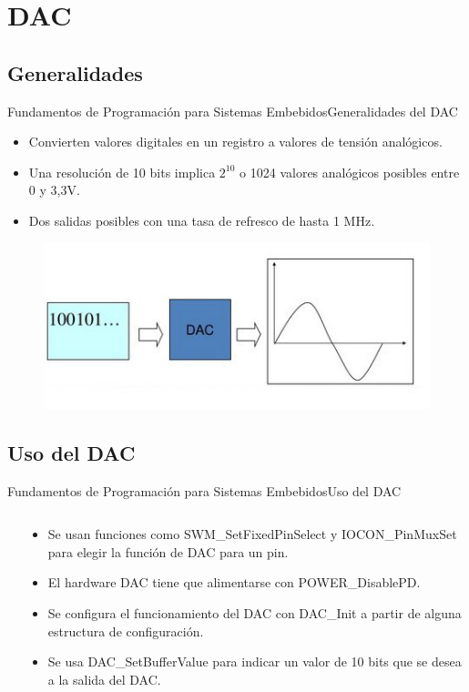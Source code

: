 \documentclass[aspectratio=169, xcolor=dvipsnames]{beamer}
\begin{document}
\section{DAC}
\subsection{Generalidades}
\begin{frame}{Fundamentos de Programación para Sistemas Embebidos}{Generalidades del DAC}
\begin{itemize}
    \item Convierten valores digitales en un registro a valores de tensión analógicos.
    \item Una resolución de 10 bits implica $2^{10}$ o 1024 valores analógicos posibles entre 0 y 3,3V.
    \item Dos salidas posibles con una tasa de refresco de hasta 1 MHz.
\end{itemize}
\begin{figure}
\centering
\includegraphics[width=0.5\linewidth]{resources/images/dac.png}
\end{figure}
\end{frame}

\subsection{Uso del DAC}
\begin{frame}{Fundamentos de Programación para Sistemas Embebidos}{Uso del DAC}
\begin{columns}
\begin{column}{0.5\textwidth}

\end{column}
\begin{column}{0.5\textwidth}
\begin{itemize}
    \item Se usan funciones como \textcolor{myblue}{SWM\_SetFixedPinSelect} y \textcolor{myblue}{IOCON\_PinMuxSet} para elegir la función de DAC para un pin.
    \item El hardware DAC tiene que alimentarse con \textcolor{myblue}{POWER\_DisablePD}.
    \item Se configura el funcionamiento del DAC con \textcolor{myblue}{DAC\_Init} a partir de alguna estructura de configuración.
    \item Se usa \textcolor{myblue}{DAC\_SetBufferValue} para indicar un valor de 10 bits que se desea a la salida del DAC.
\end{itemize}
\end{column}
\end{columns}
\end{frame}
\end{document}
